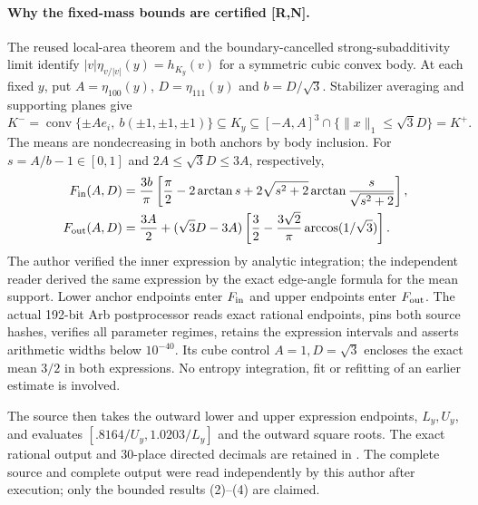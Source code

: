 \documentclass[10pt]{article}
\begin{document}
\paragraph{Why the fixed-mass bounds are certified [R,N].}
The reused local-area theorem and the boundary-cancelled
strong-subadditivity limit identify
$|v|\eta_{v/|v|}(y)=h_{K_y}(v)$ for a symmetric cubic convex body.
At each fixed $y$, put $A=\eta_{100}(y)$, $D=\eta_{111}(y)$ and
$b=D/\sqrt3$. Stabilizer averaging and supporting planes give
\[
 K^-=\operatorname{conv}\{\pm A e_i,\ b(\pm1,\pm1,\pm1)\}
       \subseteq K_y
       \subseteq[-A,A]^3\cap\{\|x\|_1\leq\sqrt3D\}=K^+ .
\]
The means are nondecreasing in both anchors by body inclusion.
For $s=A/b-1\in[0,1]$ and $2A\leq\sqrt3D\leq3A$, respectively,
\begin{align}
 F_{\rm in}(A,D)
 &=\frac{3b}{\pi}\left[
   \frac{\pi}{2}-2\arctan s+
   2\sqrt{s^2+2}\arctan\frac{s}{\sqrt{s^2+2}}\right],\\
 F_{\rm out}(A,D)
 &=\frac{3A}{2}+(\sqrt3D-3A)
       \left[\frac32-\frac{3\sqrt2}{\pi}\arccos(1/\sqrt3)\right].
\end{align}
The author verified the inner expression by analytic integration;
the independent reader derived the same expression by the exact
edge-angle formula for the mean support. Lower anchor endpoints
enter $F_{\rm in}$ and upper endpoints enter $F_{\rm out}$.
The actual 192-bit Arb postprocessor reads exact rational endpoints,
pins both source hashes, verifies all parameter regimes, retains
the expression intervals and asserts arithmetic widths below
$10^{-40}$. Its cube control $A=1,D=\sqrt3$ encloses the exact mean
$3/2$ in both expressions. No entropy integration, fit or refitting
of an earlier estimate is involved.

The source then takes the outward lower and upper expression endpoints,
$L_y,U_y$, and evaluates $[.8164/U_y,1.0203/L_y]$ and the
outward square roots. The exact rational output and 30-place
directed decimals are retained in
.
The complete source and complete output were read independently
by this author after execution; only the bounded results (2)--(4)
are claimed.
\end{document}

